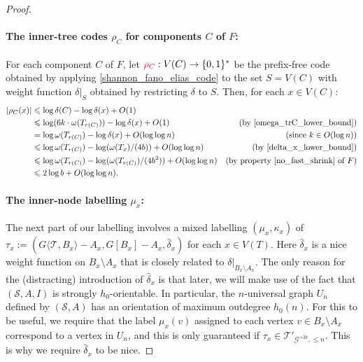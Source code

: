 \documentclass{patmorin}
\makeatletter
\let\eqref\cref
\renewcommand{\le}{\leqslant}
\def\mathcolor#1#{\@mathcolor{#1}}
\def\@mathcolor#1#2#3{%
  \protect\leavevmode
  \begingroup
    \color#1{#2}#3%
  \endgroup
}
\newcommand{\mathdefin}[1]{\mathcolor{brightmaroon}{#1}}
\newcommand{\torso}[2]{{#1}\langle{#2}\rangle}
\newcommand{\Oh}{O}
\newcommand{\calG}{\mathcal{G}}
\newcommand{\calS}{\mathcal{S}}
\newcommand{\calT}{\mathcal{T}}
\makeatother
\begin{document}
\begin{proof}
  \paragraph{\boldmath The inner-tree codes $\rho_C$ for components $C$ of $F$:}
  For each component $C$ of $F$, let $\mathdefin{\rho_C}:V(C)\to\{0,1\}^*$ be the prefix-free code obtained by applying \cref{shannon_fano_elias_code} to the set $S=V(C)$ with weight function $\delta|_S$ obtained by restricting $\delta$ to $S$.  Then, for each $x\in V(C)$:
  \begin{align}
      |\rho_C(x)| 
      & \le \log \delta(C) - \log \delta(x) + \Oh(1) \label{rho_C_bound_defn} \\
      & \le \log (6k\cdot\omega(T_{r(C)})) - \log \delta(x) + \Oh(1) 
        & \text{(by \eqref{omega_trC_lower_bound})} \nonumber \\
      & = \log\omega(T_{r(C)}) - \log\delta(x) + \Oh(\log\log n) 
        & \text{(since $k\in \Oh(\log n)$)} \nonumber \\
      & \le \log\omega(T_{r(C)}) - \log(\omega(T_x)/(4b)) + \Oh(\log\log n) 
        & \text{(by \eqref{delta_x_lower_bound})} \nonumber \\
      & \le \log\omega(T_{r(C)}) - \log(\omega(T_{r(C)})/(4b^2)) + \Oh(\log\log n) 
        & \text{(by property~\ref{no_fast_shrink} of $F$)} \nonumber \\
      & \le 2\log b + \Oh(\log\log n)  .  \label{rho_C_bound_2logb}
  \end{align}

  \paragraph{\boldmath The inner-node labelling $\mu_x$:} The next part of our labelling involves a mixed labelling $(\mu_x,\kappa_x)$ of $\tau_x:=(\torso{G}{\calT,B_x}-A_x,G[B_x]-A_x,\widehat\delta_x)$ for each $x\in V(T)$.  Here $\widehat\delta_x$ is a nice weight function on $B_x\setminus A_x$ that is closely related to $\delta|_{B_x\setminus A_x}$. The only reason for the (distracting) introduction of $\widehat\delta_x$ is that later, we will make use of the fact that $(\calS,A,I)$ is strongly $h_0$-orientable.  In particular, the $n$-universal graph $U_n$ defined by $(\calS,A)$ has an orientation of maximum outdegree $h_0(n)$. For this to be useful, we require that the label $\mu_x(v)$ assigned to each vertex $v\in B_x\setminus A_x$ correspond to a vertex in $U_n$, and this is only guaranteed if $\tau_x\in \calT'_{\calG^{+3k},\le n}$. This is why we require $\widehat\delta_x$ to be nice.
  

\end{proof}
\end{document}
